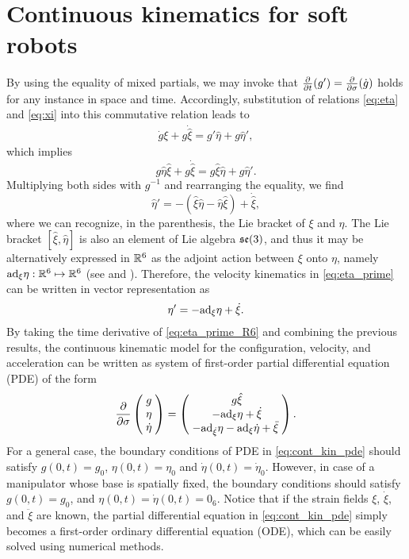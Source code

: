 \section{Continuous kinematics for soft robots}
By using the equality of mixed partials, we may invoke that $\frac{\partial}{\partial t} (g') = \frac{\partial }{\partial \sigma} (\dot{g})$ holds for any instance in space and time. Accordingly, substitution of relations \eqref{eq:eta} and \eqref{eq:xi} into this commutative relation leads to
\begin{align}
\dot{g}\xi + g\dot{\hat{\xi}}  = g'\hat{\eta} + g\hat{\eta}',
\end{align}
which implies
\begin{equation}
g\hat{\eta} \hat{\xi} + g\dot{\hat{\xi}}  = g\hat{\xi}\hat{\eta} + g\hat{\eta}'.
\end{equation}
Multiplying both sides with $g^{-1}$ and rearranging the equality, we find
\begin{equation}
\hat{\eta}' = -(\hat{\xi}\hat{\eta} - \hat{\eta} \hat{\xi}) + \dot{\hat{\xi}},\label{eq:eta_prime}
\end{equation}
where we can recognize, in the parenthesis, the Lie bracket of $\xi$ and $\eta$. The Lie bracket $[\hat{\xi},\hat{\eta}]$ is also an element of Lie algebra ${\mathfrak{se}(3)}$, and thus it may be alternatively expressed in $\mathbb{R}^6$ as the adjoint action between $\xi$ onto $\eta$, namely $\text{ad}_{\xi} \eta: \mathbb{R}^6 \mapsto \mathbb{R}^6$ (see \cite{Spong2006} and \cite{Traversaro2016}). Therefore, the velocity kinematics in \eqref{eq:eta_prime} can be written in vector representation as
\begin{equation}
\eta' = -\text{ad}_\xi \eta + \dot{\xi}.
\label{eq:eta_prime_R6}
\end{equation}
By taking the time derivative of \eqref{eq:eta_prime_R6} and combining the previous results, the continuous kinematic model for the configuration, velocity, and acceleration can be written as system of first-order partial differential equation (PDE) of the form
\begin{equation}
\frac{\partial}{\partial \sigma}\begin{pmatrix}\; g \;\\  \; \eta \; \\ \; \dot{\eta} \; \end{pmatrix} = \begin{pmatrix} \; g \hat{\xi} \\ \; -\text{ad}_\xi \eta + \dot{\xi} \\ \; -\text{ad}_{\dot{\xi}} \eta - \text{ad}_{{\xi}} \dot{\eta} + \ddot{\xi} \;\end{pmatrix}.
\label{eq:cont_kin_pde}
\end{equation}
For a general case, the boundary conditions of PDE in \eqref{eq:cont_kin_pde} should satisfy $g(0,t) = g_0$, $\eta(0,t) = \eta_0$ and $\dot{\eta}(0,t) = \dot{\eta}_0$. However, in case of a manipulator whose base is spatially fixed, the boundary conditions should satisfy $g(0,t) = g_0$, and $\eta(0,t) = \dot{\eta}(0,t) = 0_6$. Notice that if the strain fields $\xi$, $\dot{\xi}$, and $\ddot{\xi}$ are known, the partial differential equation in \eqref{eq:cont_kin_pde} simply becomes a first-order ordinary differential equation (ODE), which can be easily solved using numerical methods.